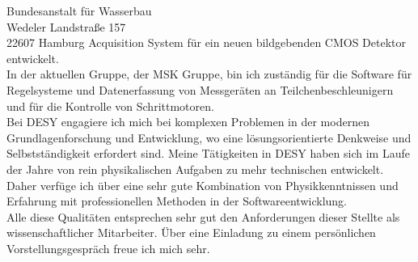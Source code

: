 \documentclass[ebner,paper=a4,fontsize=11pt,ngerman,BCOR=10mm]{scrlttr2}%
\begin{document}
\begin{letter}{Bundesanstalt f\"ur Wasserbau\\
Wedeler Landstra{\ss}e 157\\ 
22607 Hamburg}
Acquisition System f\"ur ein neuen bildgebenden CMOS Detektor entwickelt.\\
In der aktuellen Gruppe, der MSK Gruppe, bin ich zust{\"a}ndig f{\"u}r die
Software f{\"u}r Regelsysteme und Datenerfassung von Messger{\"a}ten an
Teilchenbeschleunigern und f{\"u}r die Kontrolle von Schrittmotoren.\\
\indent Bei DESY engagiere ich mich bei komplexen Problemen in der modernen
Grundlagenforschung und Entwicklung, wo eine l{\"o}sungsorientierte Denkweise
und Selbstst\"andigkeit erfordert sind. Meine T{\"a}tigkeiten in DESY haben sich
im Laufe der Jahre von rein physikalischen Aufgaben zu mehr technischen
entwickelt. Daher verf{\"u}ge ich {\"u}ber eine sehr gute Kombination von
Physikkenntnissen und Erfahrung mit professionellen Methoden in der
Softwareentwicklung.\\
\indent Alle diese Qualit{\"a}ten entsprechen sehr gut den Anforderungen
dieser Stellte als wissenschaftlicher Mitarbeiter. \"Uber eine Einladung zu
einem pers\"onlichen Vorstellungsgespr\"ach freue ich mich sehr.


\end{letter}
\end{document}
